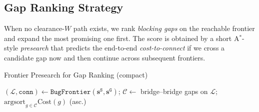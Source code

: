 \subsection{Gap Ranking Strategy}
\label{subsec:gap}
When no clearance-$W$ path exists, we rank \emph{blocking gaps} on the reachable frontier and expand the most promising one first. The score is obtained by a short A$^\ast$-style \emph{presearch} that predicts the end-to-end \emph{cost-to-connect} if we cross a candidate gap now and then continue across subsequent frontiers.
\begin{algorithm}[t]
\small
\caption{Frontier Presearch for Gap Ranking (compact)}
\label{alg:gap-ranking}
\DontPrintSemicolon
{}
$(\mathcal{L},\texttt{conn})\!\leftarrow\!\texttt{BugFrontier}(\mathbf{s}^{\texttt{S}},\mathbf{s}^{\texttt{G}})$;\;
$\mathcal{C}\!\leftarrow$ bridge–bridge gaps on $\mathcal{L}$;\;
\Return $\mathrm{argsort}_{g\in\mathcal{C}}\widehat{\mathrm{Cost}}(g)$ (asc.)\;
\end{algorithm}


